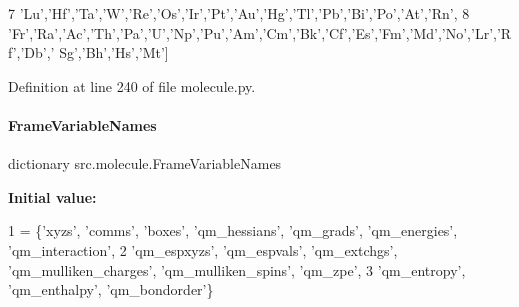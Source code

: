\begin{DoxyCode}
7             \textcolor{stringliteral}{'Lu'},\textcolor{stringliteral}{'Hf'},\textcolor{stringliteral}{'Ta'},\textcolor{stringliteral}{'W'},\textcolor{stringliteral}{'Re'},\textcolor{stringliteral}{'Os'},\textcolor{stringliteral}{'Ir'},\textcolor{stringliteral}{'Pt'},\textcolor{stringliteral}{'Au'},\textcolor{stringliteral}{'Hg'},\textcolor{stringliteral}{'Tl'},\textcolor{stringliteral}{'Pb'},\textcolor{stringliteral}{'Bi'},\textcolor{stringliteral}{'Po'},\textcolor{stringliteral}{'At'},\textcolor{stringliteral}{'Rn'},
8             \textcolor{stringliteral}{'Fr'},\textcolor{stringliteral}{'Ra'},\textcolor{stringliteral}{'Ac'},\textcolor{stringliteral}{'Th'},\textcolor{stringliteral}{'Pa'},\textcolor{stringliteral}{'U','}Np','Pu','Am','Cm','Bk','Cf','Es','Fm','Md','No','Lr','Rf','Db','
      Sg','Bh','Hs','Mt']
\end{DoxyCode}


Definition at line 240 of file molecule.\+py.

\mbox{\label{namespacesrc_1_1molecule_a16f4e1ba169d954ce12d9217c121305f}} 
\paragraph{\texorpdfstring{Frame\+Variable\+Names}{FrameVariableNames}}
{\footnotesize\ttfamily dictionary src.\+molecule.\+Frame\+Variable\+Names}

{\bfseries Initial value\+:}
\begin{DoxyCode}
1 =  \{\textcolor{stringliteral}{'xyzs'}, \textcolor{stringliteral}{'comms'}, \textcolor{stringliteral}{'boxes'}, \textcolor{stringliteral}{'qm\_hessians'}, \textcolor{stringliteral}{'qm\_grads'}, \textcolor{stringliteral}{'qm\_energies'}, \textcolor{stringliteral}{'qm\_interaction'},
2                       \textcolor{stringliteral}{'qm\_espxyzs'}, \textcolor{stringliteral}{'qm\_espvals'}, \textcolor{stringliteral}{'qm\_extchgs'}, \textcolor{stringliteral}{'qm\_mulliken\_charges'}, \textcolor{stringliteral}{'qm\_mulliken\_spins'},
       \textcolor{stringliteral}{'qm\_zpe'},
3                       \textcolor{stringliteral}{'qm\_entropy'}, \textcolor{stringliteral}{'qm\_enthalpy'}, \textcolor{stringliteral}{'qm\_bondorder'}\}
\end{DoxyCode}


